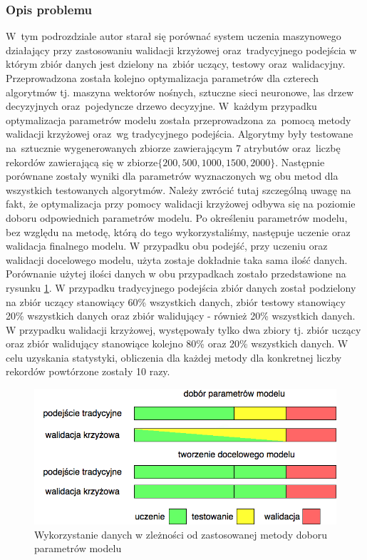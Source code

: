 \subsubsection{Opis problemu}
W~tym podrozdziale autor starał się porównać system uczenia maszynowego działający przy zastosowaniu walidacji krzyżowej oraz~tradycyjnego podejścia w którym zbiór danych jest dzielony na~zbiór uczący, testowy oraz~walidacyjny. Przeprowadzona została kolejno optymalizacja parametrów dla czterech algorytmów tj. maszyna wektorów nośnych, sztuczne sieci neuronowe, las drzew decyzyjnych oraz~pojedyncze drzewo decyzyjne. W~każdym przypadku optymalizacja parametrów modelu została przeprowadzona za~pomocą metody walidacji krzyżowej oraz~wg tradycyjnego podejścia.  Algorytmy były testowane na~sztucznie wygenerowanych zbiorze zawierającym 7 atrybutów oraz~liczbę rekordów zawierającą się w zbiorze$ \{200, 500, 1000, 1500, 2000\}.$ Następnie porównane zostały wyniki dla parametrów wyznaczonych wg obu metod dla wszystkich testowanych algorytmów. Należy zwrócić tutaj szczególną uwagę na fakt, że optymalizacja przy pomocy walidacji krzyżowej odbywa się na poziomie doboru odpowiednich parametrów modelu. Po określeniu parametrów modelu, bez względu na metodę, którą do tego wykorzystaliśmy, następuje uczenie oraz walidacja finalnego modelu. W przypadku obu podejść, przy uczeniu oraz walidacji docelowego modelu, użyta zostaje dokładnie taka sama ilość danych. Porównanie użytej ilości danych w obu przypadkach zostało przedstawione na rysunku \ref{cvdata}. W przypadku tradycyjnego podejścia zbiór danych został podzielony na zbiór uczący stanowiący 60\% wszystkich danych, zbiór testowy stanowiący 20\% wszystkich danych oraz zbiór walidujący - również 20\% wszystkich danych. W przypadku walidacji krzyżowej, występowały tylko dwa zbiory tj. zbiór uczący oraz zbiór walidujący stanowiące kolejno 80\% oraz 20\% wszystkich danych. W celu uzyskania statystyki, obliczenia dla każdej metody dla konkretnej liczby rekordów powtórzone zostały 10 razy.

\begin{figure}[ht!]
\centering
\includegraphics[scale=0.6]{res/cvdata.png}
\caption[Caption for LOF]{Wykorzystanie danych w zleżności od zastosowanej metody doboru parametrów modelu\label{cvdata}}
\end{figure} 

